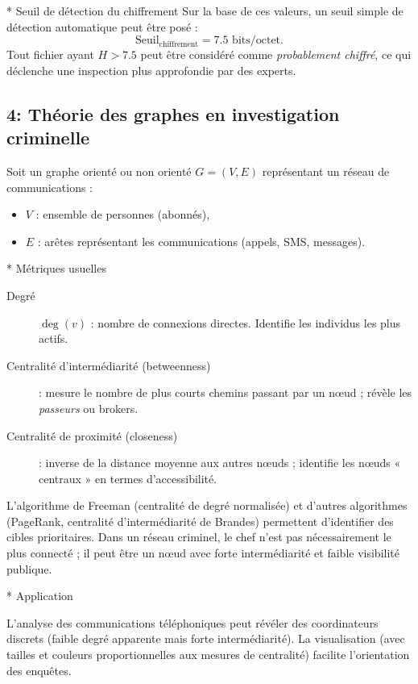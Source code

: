\documentclass[12pt,a4paper]{article}
\begin{document}
	 * Seuil de détection du chiffrement
	 Sur la base de ces valeurs, un seuil simple de détection automatique peut être posé :
	 \[
	 \text{Seuil}_{\text{chiffrement}} = 7{.}5 \text{ bits/octet}.
	 \]
	 Tout fichier ayant \(H > 7{.}5\) peut être considéré comme \emph{probablement chiffré}, ce qui déclenche une inspection plus approfondie par des experts.
	 
	 \subsection*{4: Théorie des graphes en investigation criminelle}
	 
	 Soit un graphe orienté ou non orienté \(G = (V,E)\) représentant un réseau de communications :
	 \begin{itemize}
	 	\item \(V\) : ensemble de personnes (abonnés),
	 	\item \(E\) : arêtes représentant les communications (appels, SMS, messages).
	 \end{itemize}
	 
	 * Métriques usuelles
	 \begin{description}
	 	\item[Degré] \( \deg(v)\) : nombre de connexions directes. Identifie les individus les plus actifs.
	 	\item[Centralité d'intermédiarité (betweenness)] : mesure le nombre de plus courts chemins passant par un nœud ; révèle les \emph{passeurs} ou brokers.
	 	\item[Centralité de proximité (closeness)] : inverse de la distance moyenne aux autres nœuds ; identifie les nœuds « centraux » en termes d'accessibilité.
	 \end{description}
	 
	 L'algorithme de Freeman (centralité de degré normalisée) et d'autres algorithmes (PageRank, centralité d'intermédiarité de Brandes) permettent d'identifier des cibles prioritaires. Dans un réseau criminel, le chef n'est pas nécessairement le plus connecté ; il peut être un nœud avec forte intermédiarité et faible visibilité publique.
	 
	 * Application
	 
	 L'analyse des communications téléphoniques peut révéler des coordinateurs discrets (faible degré apparente mais forte intermédiarité). La visualisation (avec tailles et couleurs proportionnelles aux mesures de centralité) facilite l'orientation des enquêtes.
	 
\end{document}
